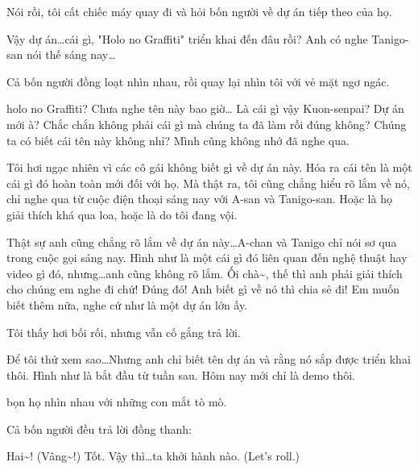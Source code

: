 \documentclass[../main.tex]{subfiles}
\begin{document}
Nói rồi, tôi cất chiếc máy quay đi và hỏi bốn người về dự án tiếp theo của họ.
\begin{dialogue}
 Vậy dự án\ldots cái gì, "Holo no Graffiti" triển khai đến đâu rồi? Anh có nghe Tanigo-san nói thế sáng nay\ldots
\end{dialogue}

Cả bốn người đồng loạt nhìn nhau, rồi quay lại nhìn tôi với vẻ mặt ngơ ngác.
\begin{dialogue}
 holo no Graffiti? Chưa nghe tên này bao giờ\ldots
{} Là cái gì vậy Kuon-senpai? Dự án mới à?
 Chắc chắn không phải cái gì mà chúng ta đã làm rồi đúng không?
 Chúng ta có biết cái tên này không nhỉ? Mình cũng không nhớ đã nghe qua.
\end{dialogue}

Tôi hơi ngạc nhiên vì các cô gái không biết gì về dự án này. Hóa ra cái tên  là một cái gì đó hoàn toàn mới đối với họ. Mà thật ra, tôi cũng chẳng hiểu rõ lắm về nó, chỉ nghe qua từ cuộc điện thoại sáng nay với A-san và Tanigo-san. Hoặc là họ giải thích khá qua loa, hoặc là do tôi đang vội.

\begin{dialogue}
 Thật sự anh cũng chẳng rõ lắm về dự án này\ldots A-chan và Tanigo chỉ nói sơ qua trong cuộc gọi sáng nay. Hình như là một cái gì đó liên quan đến nghệ thuật hay video gì đó, nhưng\ldots anh cũng không rõ lắm.
 Ối chà\~{}, thế thì anh phải giải thích cho chúng em nghe đi chứ!
 Đúng đó! Anh biết gì về nó thì chia sẻ đi!
 Em muốn biết thêm nữa, nghe cứ như là một dự án lớn ấy.
\end{dialogue}

Tôi thấy hơi bối rối, nhưng vẫn cố gắng trả lời.

\begin{dialogue}
 Để tôi thử xem sao\ldots Nhưng anh chỉ biết tên dự án và rằng nó sắp được triển khai thôi. Hình như là bắt đầu từ tuần sau. Hôm nay mới chỉ là demo thôi.
\end{dialogue}

 bọn họ nhìn nhau với những con mắt tò mò. 

Cả bốn người đều trả lời đồng thanh:
\begin{dialogue}
 Hai\~{}! (Vâng\~{}!)
 Tốt. Vậy thì\ldots ta khởi hành nào. (Let's roll.)
\end{dialogue}
\end{document}
